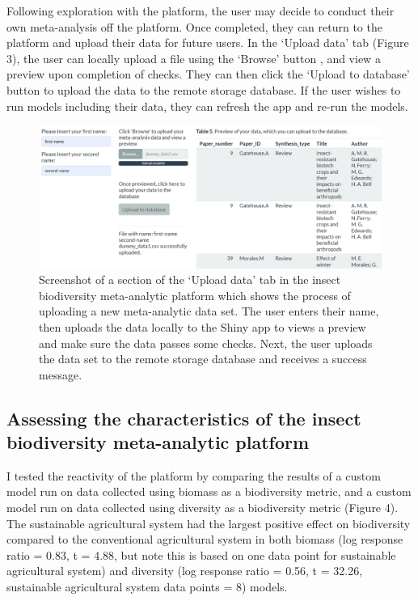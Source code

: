 \documentclass[11pt]{article}
\begin{document}
			\noindent Following exploration with the platform, the user may decide to conduct their own meta-analysis off the platform. Once completed, they can return to the platform and upload their data for future users. In the ‘Upload data’ tab (Figure 3), the user can locally upload a file using the ‘Browse’ button , and view a preview upon completion of checks. They can then click the ‘Upload to database’ button to upload the data to the remote storage database. If the user wishes to run models including their data, they can refresh the app and re-run the models.

			\begin{figure}[H] 
				\centering 
				\includegraphics[scale=0.55]{figure_3_upload_data_screenshot.png} 
				\caption{Screenshot of a section of the ‘Upload data’ tab in the insect biodiversity meta-analytic platform which shows the process of uploading a new meta-analytic data set. The user enters their name, then uploads the data locally to the Shiny app to views a preview and make sure the data passes some checks. Next, the user uploads the data set to the remote storage database and receives a success message.}  
			\end{figure}
		
		\subsection{Assessing the characteristics of the insect biodiversity meta-analytic platform}
			I tested the reactivity of the platform by comparing the results of a custom model run on data collected using biomass as a biodiversity metric, and a custom model run on data collected using diversity as a biodiversity metric (Figure 4). The sustainable agricultural system had the largest positive effect on biodiversity compared to the conventional agricultural system in both biomass (log response ratio = 0.83, t = 4.88, but note this is based on one data point for sustainable agricultural system) and diversity (log response ratio = 0.56, t = 32.26, sustainable agricultural system data points = 8) models.
			
\end{document}
